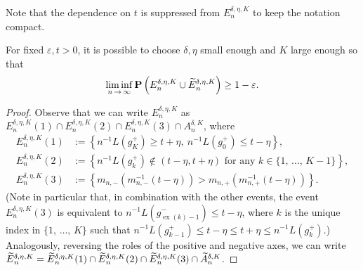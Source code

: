 \documentclass[10pt]{amsart}
\theoremstyle{definition}\newtheorem{defi}[theo]{Definition}\newtheorem{rema}[theo]{Remark}\newtheorem{exam}[theo]{Example}\newtheorem{exem}[theo]{Example}\newtheorem{nota}[theo]{Notation}
\newcommand{\bfP}{\mathbf{P}}
\newcommand\ex{\operatorname{ex}}
\newcommand{\gtt}[1]{g_{\ex(#1)-1}^-}
\let\oldtilde\tilde
\renewcommand*{\tilde}[1]{\mathchoice{\widetilde{#1}}{\widetilde{#1}}{\oldtilde{#1}}{\oldtilde{#1}}}
\begin{document}
Note that the dependence on $t$ is suppressed from $E_n^{\delta,\eta,K}$ to keep the notation compact.
\begin{prop}\label{prop:Ewhp}
For fixed $\varepsilon,t>0$, it is possible to choose $\delta, \eta$ small enough and $K$ large enough so that
\begin{align}\label{eq:Ewhp}
\liminf_{n\,\to\,\infty}\bfP\left({E}_n^{\delta,\eta,K}\cup \tilde{E}_n^{\delta,\eta,K}\right)\geq 1-\varepsilon.
\end{align}
\end{prop}
\begin{proof}
Observe that we can write $E_n^{\delta,\eta,K}$ as $E_n^{\delta,\eta,K}(1)\cap E_n^{\delta,\eta,K}(2)\cap E_n^{\delta,\eta,K}(3)\cap A_n^{\delta,K}$, where
\begin{align*}
E_n^{\delta,\eta,K}(1)&:=\left\{n^{-1}L\left(g_K^+\right)\geq t+\eta,\:n^{-1}L\left(g_0^+\right)\leq t-\eta\right\},\\
E_n^{\delta,\eta,K}(2)&:=\left\{n^{-1}L\left(g_k^+\right)\not\in(t-\eta,t+\eta)\text{ for any }k\in \{1,\,\dots,\,K-1\}\right\},\\
E_n^{\delta,\eta,K}(3)&:=\left\{m_{n,-}\left(m_{n,-}^{-1}(t-\eta)\right)> m_{n,+}\left(m_{n,+}^{-1}(t-\eta)\right)\right\}.
\end{align*}
(Note in particular that, in combination with the other events, the event $E_n^{\delta,\eta,K}(3)$ is equivalent to $n^{-1}L(\gtt{k})\leq t-\eta$, where $k$ is the unique index in $\{1,\,\dots,\,K\}$ such that $n^{-1}L(g_{k-1}^+)\leq t-\eta\leq t+\eta\leq n^{-1}L(g_k^+)$.) Analogously, reversing the roles of the positive and negative axes, we can write $\tilde{E}_n^{\delta,\eta,K}= \tilde{E}_n^{\delta,\eta,K}(1)\cap \tilde{E}_n^{\delta,\eta,K}(2)\cap\tilde{E}_n^{\delta,\eta,K}(3) \cap \tilde{A}_n^{\delta,K}$.


\end{proof}
\end{document}
